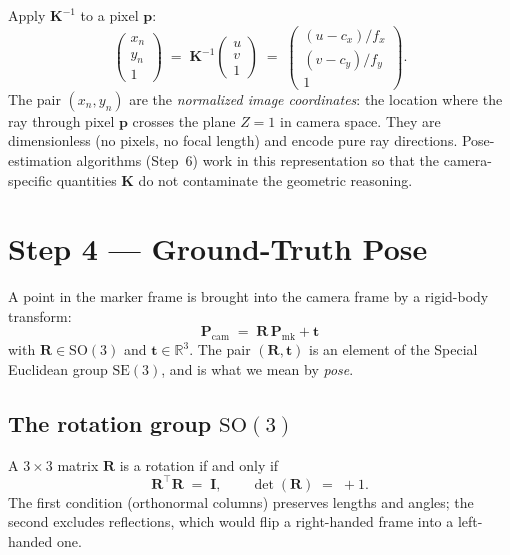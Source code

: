 \documentclass[11pt]{article}
\newcommand{\R}{\mathbb{R}}
\newcommand{\SO}[1]{\mathrm{SO}(#1)}
\newcommand{\SE}[1]{\mathrm{SE}(#1)}
\newcommand{\Pcam}{\mathbf{P}_{\text{cam}}}
\newcommand{\Pmark}{\mathbf{P}_{\text{mk}}}
\newcommand{\KK}{\mathbf{K}}
\begin{document}
Apply $\KK^{-1}$ to a pixel $\mathbf{p}$:
\begin{equation}
  \begin{pmatrix} x_n \\ y_n \\ 1 \end{pmatrix}
  \;=\; \KK^{-1}
  \begin{pmatrix} u \\ v \\ 1 \end{pmatrix}
  \;=\;
  \begin{pmatrix} (u - c_x)/f_x \\ (v - c_y)/f_y \\ 1 \end{pmatrix}.
\end{equation}
The pair $(x_n, y_n)$ are the \emph{normalized image coordinates}: the
location where the ray through pixel $\mathbf{p}$ crosses the plane
$Z = 1$ in camera space. They are dimensionless (no pixels, no focal
length) and encode pure ray directions. Pose-estimation algorithms (Step~6)
work in this representation so that the camera-specific quantities $\KK$
do not contaminate the geometric reasoning.

\section{Step 4 --- Ground-Truth Pose}

A point in the marker frame is brought into the camera frame by a
rigid-body transform:
\begin{equation}
  \boxed{\quad \Pcam \;=\; \mathbf{R}\,\Pmark + \mathbf{t} \quad}
  \label{eq:rigid-transform}
\end{equation}
with $\mathbf{R} \in \SO{3}$ and $\mathbf{t} \in \R^3$. The pair
$(\mathbf{R}, \mathbf{t})$ is an element of the Special Euclidean group
$\SE{3}$, and is what we mean by \emph{pose}.

\subsection{The rotation group \texorpdfstring{$\SO{3}$}{SO(3)}}

A $3\times 3$ matrix $\mathbf{R}$ is a rotation if and only if
\begin{equation}
  \mathbf{R}^\top \mathbf{R} \;=\; \mathbf{I},
  \qquad
  \det(\mathbf{R}) \;=\; +1.
  \label{eq:so3-constraints}
\end{equation}
The first condition (orthonormal columns) preserves lengths and angles; the
second excludes reflections, which would flip a right-handed frame into a
left-handed one.
\end{document}
